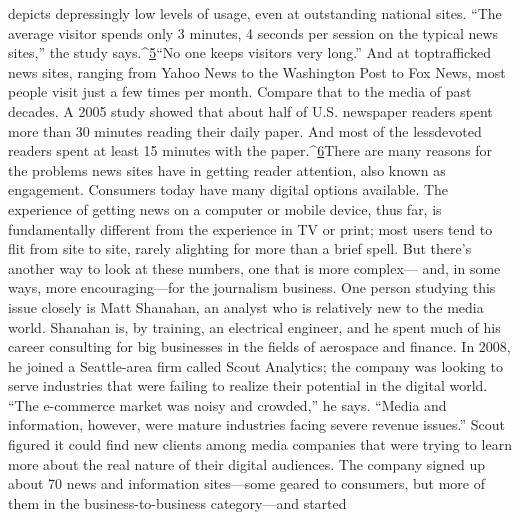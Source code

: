 depicts depressingly low levels of usage, even at outstanding national sites.
``The average visitor spends only 3 minutes, 4 seconds per session on the typical
news sites,'' the study says.^{\href{#endnotes-chapter-2}{5}}``No one keeps visitors very long.'' And at toptrafficked
news sites, ranging from Yahoo News to the Washington Post to Fox
News, most people visit just a few times per month. Compare that to the media
of past decades. A 2005 study showed that about half of U.S. newspaper readers
spent more than 30 minutes reading their daily paper. And most of the lessdevoted
readers spent at least 15 minutes with the paper.^{\href{#endnotes-chapter-2}{6}}There are many reasons for the problems news sites have in getting reader attention,
also known as engagement. Consumers today have many digital options
available. The experience of getting news on a computer or mobile device, thus
far, is fundamentally different from the experience in TV or print; most users
tend to flit from site to site, rarely alighting for more than a brief spell.
But there's another way to look at these numbers, one that is more complex—
and, in some ways, more encouraging—for the journalism business.
One person studying this issue closely is Matt Shanahan, an analyst who is
relatively new to the media world. Shanahan is, by training, an electrical engineer,
and he spent much of his career consulting for big businesses in the fields of
aerospace and finance. In 2008, he joined a Seattle-area firm called Scout Analytics;
the company was looking to serve industries that were failing to realize their
potential in the digital world. ``The e-commerce market was noisy and crowded,''
he says. ``Media and information, however, were mature industries facing severe
revenue issues.'' Scout figured it could find new clients among media companies
that were trying to learn more about the real nature of their digital audiences.
The company signed up about 70 news and information sites—some geared to
consumers, but more of them in the business-to-business category—and started

